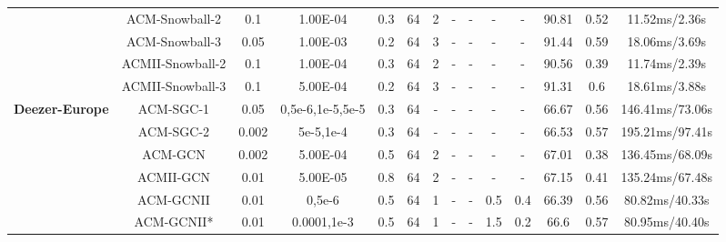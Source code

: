 \documentclass{article}
\newcommand{\0}{{\boldsymbol{0}}}
\newcommand{\6}{{\partial}}
\newcommand{\8}{{\infty}}
\newcommand{\4}{{\nabla}}
\begin{document}
\begin{table}[htbp]
{\begin{tabular}{c|c|cccccccccccc}
          & ACM-Snowball-2 & 0.1   & 1.00E-04 & 0.3   & 64    & 2     & -     & -     & -     & -     & 90.81 & 0.52  & 11.52ms/2.36s \\
          & ACM-Snowball-3 & 0.05  & 1.00E-03 & 0.2   & 64    & 3     & -     & -     & -     & -     & 91.44 & 0.59  & 18.06ms/3.69s \\
          & ACMII-Snowball-2 & 0.1   & 1.00E-04 & 0.3   & 64    & 2     & -     & -     & -     & -     & 90.56 & 0.39  & 11.74ms/2.39s \\
          & ACMII-Snowball-3 & 0.1   & 5.00E-04 & 0.2   & 64    & 3     & -     & -     & -     & -     & 91.31 & 0.6   & 18.61ms/3.88s \\
          \midrule
    \multirow{6}[1]{*}{\textbf{Deezer-Europe}} & ACM-SGC-1 & 0.05  & 0,5e-6,1e-5,5e-5 & 0.3   & 64    & -     & -     & -     & -     & -     & 66.67 & 0.56  & 146.41ms/73.06s \\
          & ACM-SGC-2 & 0.002 & {5e-5,1e-4} & 0.3   & 64    & -     & -     & -     & -     & -     & 66.53 & 0.57  & 195.21ms/97.41s \\
          & ACM-GCN & 0.002 & 5.00E-04 & 0.5   & 64    & 2     & -     & -     & -     & -     & 67.01 & 0.38  & 136.45ms/68.09s \\
          & ACMII-GCN & 0.01  & 5.00E-05 & 0.8   & 64    & 2     & -     & -     & -     & -     & 67.15 & 0.41  & 135.24ms/67.48s \\
          & ACM-GCNII & 0.01  & 0,5e-6 & 0.5   & 64    & 1     & -     & -     & 0.5   & 0.4   & 66.39 & 0.56  & 80.82ms/40.33s \\
          & ACM-GCNII* & 0.01  & 0.0001,1e-3 & 0.5   & 64    & 1     & -     & -     & 1.5   & 0.2   & 66.6  & 0.57  & 80.95ms/40.40s \\
    \bottomrule
    \bottomrule
    \end{tabular}\label{tab:hyperparameters_acmgnns}}
\end{table} \begin{table}[htbp]
  \centering
  \caption{Optimal hyperparameters for ACM(II)-GCN+ and ACM(II)-GCN++ on random 60\%/20\%/20\% splits}
\end{table}
\end{document}

